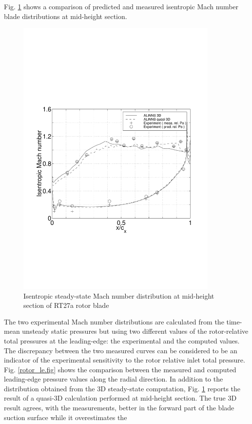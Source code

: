  Fig. \ref{rotor_blade_machis1.fig} shows a comparison of predicted and measured
 isentropic Mach number blade distributions at mid-height section.
%
\begin{figure}
  \centerline{\includegraphics[width=100mm,clip=t]{CHAP_RT27/FIGURE/mid.pdf}}
  \caption{Isentropic steady-state Mach number distribution at
           mid-height section of RT27a rotor blade}
  \label{rotor_blade_machis1.fig}
\end{figure}
%
 The two experimental Mach number distributions are calculated from
 the time-mean unsteady static pressures but using two different values of
 the rotor-relative total pressures at the leading-edge: the experimental
 and the computed values.
 The discrepancy between the two measured curves can be considered to
 be an indicator of the experimental sensitivity to the rotor relative inlet
 total pressure.
 Fig. \ref{rotor_le.fig} shows the comparison between the measured and computed
 leading-edge pressure values along the radial direction.
 In addition to the distribution obtained from the 3D
 steady-state computation,
 Fig. \ref{rotor_blade_machis1.fig} reports the result of a quasi-3D
 calculation performed at mid-height section.
 The true 3D result agrees, with the measurements,
 better in the forward part
 of the blade suction surface while it overestimates the
